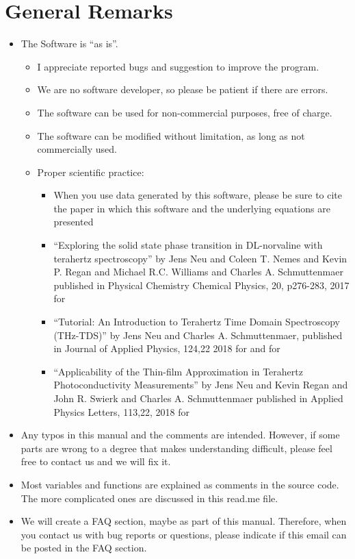 \documentclass[12pt]{article}
\begin{document}
\section{General Remarks}
\begin{itemize}
	\item The Software is "`as is"'. 
	\begin{itemize}
		\item 	I appreciate reported bugs and suggestion to improve the program.
		\item 	We are no software developer, so please be patient if there are errors.
		\item 	The software can be used for non-commercial purposes, free of charge. 
		\item 	The software can be modified without limitation, as long as not commercially used. 
		\item 	Proper scientific practice:
		\begin{itemize}
			\item 	When you use data generated by this software, please be sure to cite the paper in which this software and the underlying equations are presented 	
			\item \cite{neu2017PCCP} "`Exploring the 		solid state phase transition in DL-norvaline with terahertz spectroscopy"' by Jens Neu and Coleen T. Nemes and Kevin P. Regan and Michael R.C. Williams and Charles A. Schmuttenmaer published in Physical Chemistry Chemical Physics, 20, p276-283, 2017  for \textbf{\pellet}
			\item  \cite{Neu2018} "`Tutorial: An Introduction to Terahertz Time Domain Spectroscopy (THz-TDS)"' by Jens Neu and Charles A. Schmuttenmaer, published in Journal of Applied Physics, 124,22 2018 for \textbf{\pellet} and for \textbf{\TDS}
\item	\cite{thinfilm} "`Applicability of the Thin-film Approximation in Terahertz Photoconductivity Measurements"' by Jens Neu and Kevin Regan and John R. Swierk and Charles A. Schmuttenmaer published in Applied Physics Letters, 113,22, 2018 for \textbf{\TRTS}
		\end{itemize}
				\end{itemize}
				\item Any typos in this manual and the comments are intended. However, if some parts are wrong to a degree that makes understanding difficult, please feel free to contact us and we will fix it. 
				\item Most variables and functions are explained as comments in the source code. The more complicated ones are discussed in this read.me file. 
				\item We will create a FAQ section, maybe as part of this manual. Therefore, when you contact us with bug reports or questions, please indicate if this email can be posted in the FAQ section.
\end{itemize}
\end{document}
